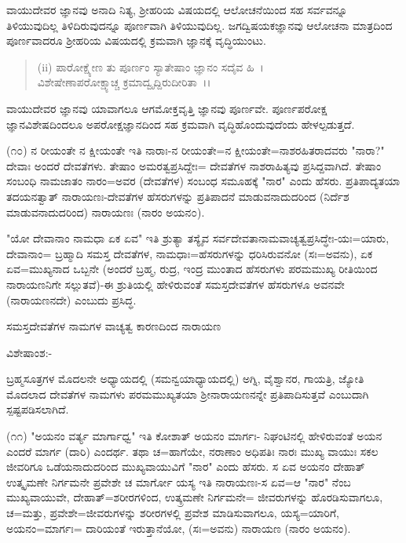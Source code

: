 ವಾಯುದೇವರ ಜ್ಞಾನವು ಅನಾದಿ ನಿತ್ಯ, ಶ‍್ರೀಹರಿಯ ವಿಷಯದಲ್ಲಿ ಆಲೋಚನೆಯಿಂದ ಸಹ ಸರ್ವವನ್ನೂ ತಿಳಿಯುವುದಿಲ್ಲ ತಿಳಿದಿರುವುದನ್ನೂ ಪೂರ್ಣವಾಗಿ ತಿಳಿಯುವುದಿಲ್ಲ. ಜಗದ್ವಿಷಯಕಜ್ಞಾನವು ಆಲೋಚನಾ ಮಾತ್ರದಿಂದ ಪೂರ್ಣವಾದರೂ ಶ‍್ರೀಹರಿಯ ವಿಷಯದಲ್ಲಿ ಕ್ರಮವಾಗಿ ಜ್ಞಾನಕ್ಕೆ ವೃದ್ಧಿಯುಂಟು.

\begin{verse}
 (ii) ಪಾರೋಕ್ಷ್ಯೇಣ ತು ಪೂರ್ಣಂ ಸ್ಯಾತೇಷಾಂ ಜ್ಞಾನಂ ಸದೈವ ಹಿ~।\\ ವಿಶೇಷೇಣಾಪರೋಕ್ಷ್ಯಾಚ್ಚ ಕ್ರಮಾದ್ವೃದ್ದಿರುದೀರಿತಾ~।।
\end{verse}


\noindent
ವಾಯುದೇವರ ಜ್ಞಾನವು ಯಾವಾಗಲೂ ಆಗಮೋಕ್ತವೃತ್ತಿ ಜ್ಞಾನವು ಪೂರ್ಣವೇ. ಪೂರ್ಣಪರೋಕ್ಷ ಜ್ಞಾನವಿಶೇಷದಿಂದಲೂ ಅಪರೋಕ್ಷಜ್ಞಾನದಿಂದ ಸಹ ಕ್ರಮವಾಗಿ ವೃದ್ಧಿಹೊಂದುವುದೆಂದು ಹೇಳಲ್ಪಡುತ್ತದೆ.

(೧೦) ನ ರೀಯಂತೇ ನ ಕ್ಷೀಯಂತೇ ಇತಿ ನಾರಾಃ-ನ ರೀಯಂತೇ=ನ ಕ್ಷೀಯಂತೇ=ನಾಶರಹಿತರಾದವರು "ನಾರಾ?" ದೇವಾಃ ಅಂದರೆ ದೇವತೆಗಳು. ತೇಷಾಂ ಅಮರತ್ವಪ್ರಸಿದ್ದೇಃ= ದೇವತೆಗಳ ನಾಶರಾಹಿತ್ಯವು ಪ್ರಸಿದ್ದವಾಗಿದೆ. ತೇಷಾಂ ಸಂಬಂಧಿ ನಾಮಜಾತಂ ನಾರಂ=ಅವರ (ದೇವತೆಗಳ) ಸಂಬಂಧ ಸಮೂಹಕ್ಕೆ "ನಾರ" ಎಂದು ಹೆಸರು. ಪ್ರತಿಪಾದ್ಯತಯಾ ತದಯನತ್ವಾತ್ ನಾರಾಯಣಃ-ದೇವತೆಗಳ ಹೆಸರುಗಳನ್ನು ಪ್ರತಿಪಾದನೆ ಮಾಡುವನಾದುದರಿಂದ (ನಿರ್ದೆಶ ಮಾಡುವನಾದುದರಿಂದ) ನಾರಾಯಣಃ (ನಾರಂ ಅಯನ೦).

"ಯೋ ದೇವಾನಾಂ ನಾಮಧಾ ಏಕ ಏವ" ಇತಿ ಶ್ರುತ್ಯಾ ತಸ್ಯೈವ ಸರ್ವದೇವತಾನಾಮವಾಚ್ಯತ್ವಪ್ರಸಿದ್ಧೇಃ-ಯಃ=ಯಾರು, ದೇವಾನಾಂ= ಬ್ರಹ್ಮಾದಿ ಸಮಸ್ತ ದೇವತೆಗಳ, ನಾಮಧಾಃ=ಹೆಸರುಗಳನ್ನು ಧರಿಸಿರುವನೋ (ಸಃ=ಅವನು), ಏಕ ಏವ=ಮುಖ್ಯನಾದ ಒಬ್ಬನೇ (ಅಂದರೆ ಬ್ರಹ್ಮ, ರುದ್ರ, ಇಂದ್ರ ಮುಂತಾದ ಹೆಸರುಗಳು ಪರಮಮುಖ್ಯ ರೀತಿಯಿಂದ ನಾರಾಯಣನಿಗೇ ಸಲ್ಲುತವೆ)-ಈ ಶ್ರುತಿಯಲ್ಲಿ ಹೇಳಿರುವಂತೆ ಸಮಸ್ತದೇವತೆಗಳ ಹೆಸರುಗಳೂ ಅವನವೇ (ನಾರಾಯಣನದೇ) ಎಂಬುದು ಪ್ರಸಿದ್ಧ.

\begin{center}
ಸಮಸ್ತದೇವತೆಗಳ ನಾಮಗಳ ವಾಚ್ಯತ್ವ ಕಾರಣದಿಂದ ನಾರಾಯಣ
\end{center}

\noindent
ವಿಶೇಷಾಂಶ:-

ಬ್ರಹ್ಮಸೂತ್ರಗಳ ಮೊದಲನೇ ಅಧ್ಯಾಯದಲ್ಲಿ (ಸಮನ್ವಯಾಧ್ಯಾಯದಲ್ಲಿ) ಅಗ್ನಿ, ವೈಶ್ವಾನರ, ಗಾಯತ್ರಿ, ಜ್ಯೋತಿ ಮೊದಲಾದ ದೇವತೆಗಳ ನಾಮಗಳು ಪರಮಮುಖ್ಯತಯಾ ಶ‍್ರೀನಾರಾಯಣನನ್ನೇ ಪ್ರತಿಪಾದಿಸುತ್ತವೆ ಎಂಬುದಾಗಿ ಸ್ಪಷ್ಟಪಡಿಸಲಾಗಿದೆ.

(೧೧) "ಅಯನಂ ವರ್ತ್ಯ ಮಾರ್ಗಾಧ್ವ" ಇತಿ ಕೋಶಾತ್ ಅಯನಂ ಮಾರ್ಗಃ- ನಿಘಂಟಿನಲ್ಲಿ ಹೇಳಿರುವಂತೆ ಅಯನ ಎಂದರೆ ಮಾರ್ಗ (ದಾರಿ) ಎಂದರ್ಥ. ತಥಾ ಚ=ಹಾಗೆಯೇ, ನರಾಣಾಂ ಅಧಿಪತಿಃ ನಾರಃ ಮುಖ್ಯ ವಾಯುಃ ಸಕಲ ಜೀವರಿಗೂ ಒಡೆಯನಾದುದರಿಂದ ಮುಖ್ಯವಾಯುವಿಗೆ "ನಾರ" ಎಂದು ಹೆಸರು. ಸ ಏವ ಅಯನಂ ದೇಹಾತ್ ಉತ್ಕೃಮಣೇ ನಿರ್ಗಮನೇ ಪ್ರವೇಶೇ ಚ ಮಾರ್ಗೋ ಯಸ್ಯ ಇತಿ ನಾರಾಯಣಃ-ಸ ಏವ=ಆ "ನಾರ" ನೆಂಬ ಮುಖ್ಯವಾಯುವೇ, ದೇಹಾತ್=ಶರೀರಗಳಿಂದ, ಉತ್ಕ್ರಮಣೇ ನಿರ್ಗಮನೇ= ಜೀವರುಗಳನ್ನು ಹೊರಡಿಸುವಾಗಲೂ, ಚ=ಮತ್ತು, ಪ್ರವೇಶೇ=ಜೀವರುಗಳನ್ನು ಶರೀರಗಳಲ್ಲಿ ಪ್ರವೇಶ ಮಾಡಿಸುವಾಗಲೂ, ಯಸ್ಯ=ಯಾರಿಗೆ, ಅಯನಂ=ಮಾರ್ಗಃ= ದಾರಿಯಂತೆ ಇರುತ್ತಾನೆಯೋ, (ಸಃ=ಅವನು) ನಾರಾಯಣ (ನಾರಂ ಅಯನಂ).


